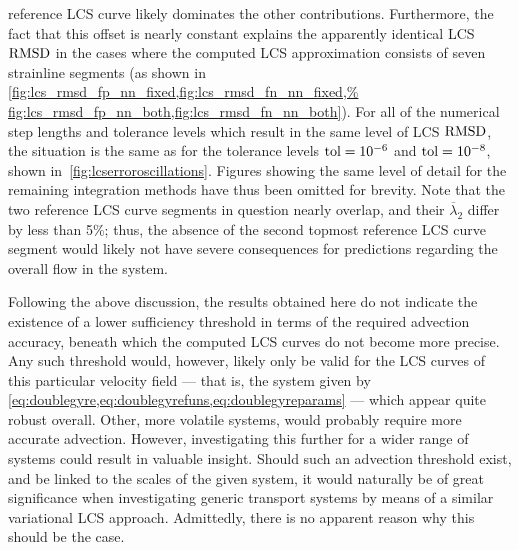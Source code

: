 reference LCS curve likely dominates the other contributions. Furthermore, the
fact that this offset is nearly constant explains the apparently identical LCS
$\operatorname{RMSD}$ in the cases where the computed LCS approximation consists of seven
strainline segments (as shown in
\cref{fig:lcs_rmsd_fp_nn_fixed,fig:lcs_rmsd_fn_nn_fixed,%
fig:lcs_rmsd_fp_nn_both,fig:lcs_rmsd_fn_nn_both}). For all of the numerical step
lengths and tolerance levels which result in the same level of LCS $\operatorname{RMSD}$, the
situation is the same as for the  tolerance levels $\textnormal{tol}=10^{-6}$
and $\textnormal{tol}=10^{-8}$, shown in~\cref{fig:lcserroroscillations}. Figures
showing the same level of  detail for the remaining integration methods have
thus been omitted for brevity. Note that the two reference LCS curve
segments in question nearly overlap, and their $\overline{\lambda}_{2}$ differ
by less than 5\%; thus, the absence of the second topmost reference LCS curve
segment would likely not have severe consequences for predictions regarding
the overall flow in the system.



Following the above discussion, the results obtained here do not indicate
the existence of a lower sufficiency threshold in terms of the required
advection accuracy, beneath which the computed LCS curves do not become more
precise. Any such threshold would, however, likely only be valid for the LCS
curves of this particular velocity field --- that is, the system given by
\cref{eq:doublegyre,eq:doublegyrefuns,eq:doublegyreparams} --- which
appear quite robust overall. Other, more volatile systems, would probably
require more accurate advection. However, investigating this further for a
wider range of systems could result in valuable insight. Should such an
advection threshold exist, and be linked to the scales of the given system,
it would naturally be of great significance when investigating generic transport
systems by means of a similar variational LCS approach. Admittedly, there is no
apparent reason why this should be the case.

